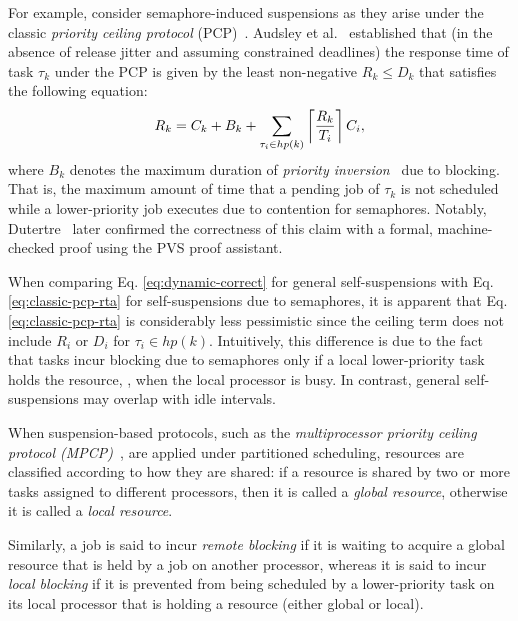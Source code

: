For example, consider semaphore-induced suspensions as they arise under the classic \emph{priority ceiling protocol} (PCP)~\cite{SRL:90}. Audsley et al.~\cite{audsley-1993} established that (in the absence of release jitter and assuming constrained deadlines) the response time of task $\tau_k$ under the PCP is given by the least non-negative $R_k \leq D_k$ that satisfies the following equation:
\begin{equation}
R_k = C_k+ B_k+\sum_{\tau_i \in hp(k)}\left\lceil{\frac{R_k}{T_i}}\right\rceil C_i,
\label{eq:classic-pcp-rta}
\end{equation}
where $B_k$ denotes the maximum duration of \emph{priority inversion}~\cite{SRL:90} due to blocking. That is, the maximum amount of time that a pending job of $\tau_k$ is not scheduled while a lower-priority job executes due to contention for semaphores. Notably, Dutertre~\cite{Du:99} later confirmed the correctness of this claim  with a formal, machine-checked proof using the PVS proof assistant. 

When comparing Eq. \eqref{eq:dynamic-correct}  for general self-suspensions  with Eq.  \eqref{eq:classic-pcp-rta} for self-suspensions due to semaphores, it is apparent that Eq. \eqref{eq:classic-pcp-rta} is considerably less pessimistic since the ceiling term does not include $R_i$ or $D_i$ for $\tau_i \in hp(k)$. Intuitively, this difference is due to the fact that tasks incur blocking due to semaphores only if a local lower-priority task holds the resource, \ie, when the local processor is busy. In contrast, general self-suspensions may overlap with idle intervals.


\label{sec:sem-multi}

When suspension-based protocols, such as the \emph{multiprocessor priority ceiling protocol (MPCP)}~\cite{rajkumar-1990}, are applied under partitioned scheduling, resources are classified according to how they are shared: if a resource is shared by two or more tasks assigned to different processors, then it is called a \emph{global resource}, otherwise it is called a \emph{local resource}.

Similarly, a job is said to incur \emph{remote blocking} if it is waiting to acquire a global resource that is held by a job on another processor, whereas it is said to incur \emph{local blocking} if it is prevented from being scheduled by a lower-priority task on its local processor that is holding a resource (either global or local).

